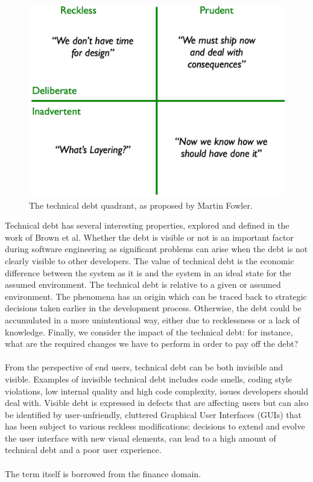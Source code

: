 \begin{figure}[!h]
	\centering
	\includegraphics[width=0.5\columnwidth]{images/introduction/technical_debt_quadrant}
	\caption{The technical debt quadrant, as proposed by Martin Fowler.}
	\label{fig:technical-debt-quadrant}
\end{figure}

Technical debt has several interesting properties, explored and defined in the work of Brown et al\cite{brown2010managing}. 
Whether the debt is visible or not is an important factor during software engineering as significant problems can arise when the debt is not clearly visible to other developers.
The value of technical debt is the economic difference between the system as it is and the system in an ideal state for the assumed environment.
The technical debt is relative to a given or assumed environment.
The phenomena has an origin which can be traced back to strategic decisions taken earlier in the development process. Otherwise, the debt could be accumulated in a more unintentional way, either due to recklessness or a lack of knowledge.
Finally, we consider the impact of the technical debt: for instance, what are the required changes we have to perform in order to pay off the debt?\\\\
From the perspective of end users, technical debt can be both invisible and visible\cite{kruchten2012technical}.
Examples of invisible technical debt includes code smells, coding style violations, low internal quality and high code complexity, issues developers should deal with.
Visible debt is expressed in defects that are affecting users but can also be identified by user-unfriendly, cluttered Graphical User Interfaces (GUIs) that has been subject to various reckless modifications: decisions to extend and evolve the user interface with new visual elements, can lead to a high amount of technical debt and a poor user experience.\\\\
The term itself is borrowed from the finance domain\cite{guo2011portfolio}.

